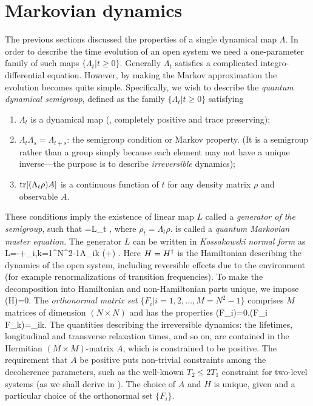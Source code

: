 \section{Markovian dynamics}
\label{sec:markov}
The previous sections discussed the properties of a single dynamical map $\Lambda$. In order to describe the time evolution of an open system we need a one-parameter family of such maps $\{\Lambda_t | t \ge0\}$. Generally $\Lambda_t$ satisfies a complicated integro-differential equation. However,  by making the Markov approximation the evolution becomes quite simple. Specifically, we wish to describe the \emph{quantum dynamical semigroup}, defined as the family $\{\Lambda_t | t \ge0\}$ satisfying
\begin{enumerate}
    \item $\Lambda_t$ is a dynamical map (\ie, completely positive and trace preserving);
    \item $\Lambda_t\Lambda_s=\Lambda_{t+s}$: the semigroup condition or Markov property. (It is a semigroup rather than a group simply because each element may not have a unique inverse---the purpose is to describe \emph{irreversible} dynamics);
    \item $\operatorname{tr} [(\Lambda_t \rho)A]$ is a continuous function of $t$ for any density matrix $\rho$ and observable $A$.
\end{enumerate}
These conditions imply the existence of linear map $L$ called a \emph{generator of the semigroup}, such that
\be
    \label{eq:qmme}
    =L\rho_t ,
\ee
where $\rho_t=\Lambda_t\rho$.  is called a \emph{quantum Markovian master equation}. The generator $L$ can be written in \emph{Kossakowski normal form} \cite{Kossakowski1972} as
\be
    \label{eq:kossa}
    L\rho=-\rmi{}+\sum_{i,k=1}^{N^2-1}A_{ik}
        \Bigl(+\Bigr) .
\ee
Here $H=H^{\dag}$ is the Hamiltonian describing the dynamics of the open system, including reversible effects due to the environment (for example renormalizations of transition frequencies). To make the decomposition into Hamiltonian and non-Hamiltonian parts unique, we impose
\be
    \label{eq:tracelessH}
    \tr(H)=0.
\ee
The \emph{orthonormal matrix set} $\{F_i|i=1,2,\ldots,M=N^2-1\}$ comprises $M$ matrices of dimension $(N\times N)$ and has the properties
\be
    \tr(F_i)=0,\qquad \tr(F\pdg_i F\dg_k)=\delta_{ik}.
\ee
The quantities describing the irreversible dynamics: the lifetimes, longitudinal and transverse relaxation times, and so on, are contained in the Hermitian $(M\times M)$-matrix $A$, which is constrained to be positive. The requirement that $A$ be positive puts non-trivial constraints among the decoherence parameters, such as the well-known $T_2\le 2 T_1$ constraint for two-level systems (as we shall derive in ). The choice of $A$ and $H$ is unique, given  and a particular choice of the orthonormal set $\{F_i\}$.

